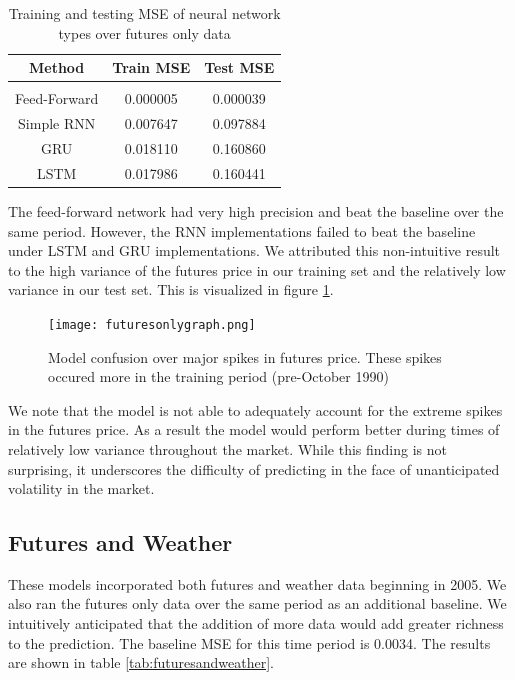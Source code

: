 \documentclass[twoside,11pt]{article}
\begin{document}
\begin{table}[h!]
	\begin{center}
		\begin{tabular}{ccc}
		    Method & Train MSE & Test MSE \\
		\hline \\[-11pt]
		Feed-Forward & 0.000005 & 0.000039 \\
		Simple RNN & 0.007647 & 0.097884 \\ 
	    GRU & 0.018110 & 0.160860 \\
		LSTM & 0.017986 & 0.160441 \\
		\hline
		\end{tabular}
		\caption{Training and testing MSE of neural network types over futures only data}\label{tab:futuresonly}
	\end{center}
\end{table}

The feed-forward network had very high precision and beat the baseline over the same period. However, the RNN implementations failed to beat the baseline under LSTM and GRU implementations. We attributed this non-intuitive result to the high variance of the futures price in our training set and the relatively low variance in our test set. This is visualized in figure \ref{fig:futuresonlygraph}. 

\begin{figure}[htbp]
	\centering
	\texttt{[image: futuresonlygraph.png]}
	\caption{Model confusion over major spikes in futures price. These spikes occured more in the training period (pre-October 1990)} \label{fig:futuresonlygraph}
\end{figure}

We note that the model is not able to adequately account for the extreme spikes in the futures price. As a result the model would perform better during times of relatively low variance throughout the market. While this finding is not surprising, it underscores the difficulty of predicting in the face of unanticipated volatility in the market.   

\subsection{Futures and Weather}

These models incorporated both futures and weather data beginning in 2005. We also ran the futures only data over the same period as an additional baseline. We intuitively anticipated that the addition of more data would add greater richness to the prediction. The baseline MSE for this time period is 0.0034. The results are shown in table \ref{tab:futuresandweather}.
\end{document}
